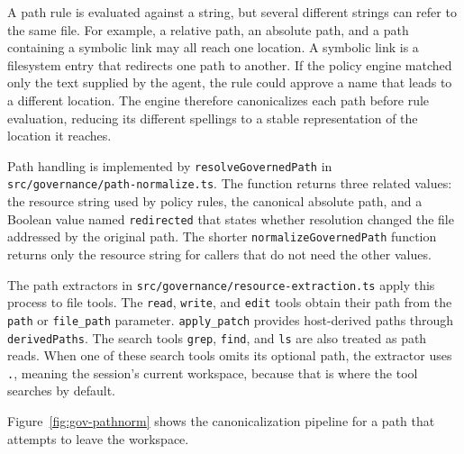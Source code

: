 A path rule is evaluated against a string, but several different strings can
refer to the same file. For example, a relative path, an absolute path, and a
path containing a symbolic link may all reach one location. A symbolic link is
a filesystem entry that redirects one path to another. If the policy engine
matched only the text supplied by the agent, the rule could approve a name that
leads to a different location. The engine therefore canonicalizes each path
before rule evaluation, reducing its different spellings to a stable
representation of the location it reaches.

Path handling is implemented by \texttt{resolveGovernedPath} in
\texttt{src/governance/path-normalize.ts}. The function returns three related
values: the resource string used by policy rules, the canonical absolute path,
and a Boolean value named \texttt{redirected} that states whether resolution
changed the file addressed by the original path. The shorter
\texttt{normalizeGovernedPath} function returns only the resource string for
callers that do not need the other values.

The path extractors in
\texttt{src/governance/resource-extraction.ts} apply this process to file
tools. The \texttt{read}, \texttt{write}, and \texttt{edit} tools obtain their
path from the \texttt{path} or \texttt{file\_path} parameter.
\texttt{apply\_patch} provides host-derived paths through
\texttt{derivedPaths}. The search tools \texttt{grep}, \texttt{find}, and
\texttt{ls} are also treated as path reads. When one of these search tools
omits its optional path, the extractor uses \texttt{.}, meaning the session's
current workspace, because that is where the tool searches by default.

Figure~\ref{fig:gov-pathnorm} shows the canonicalization pipeline for a path
that attempts to leave the workspace.


